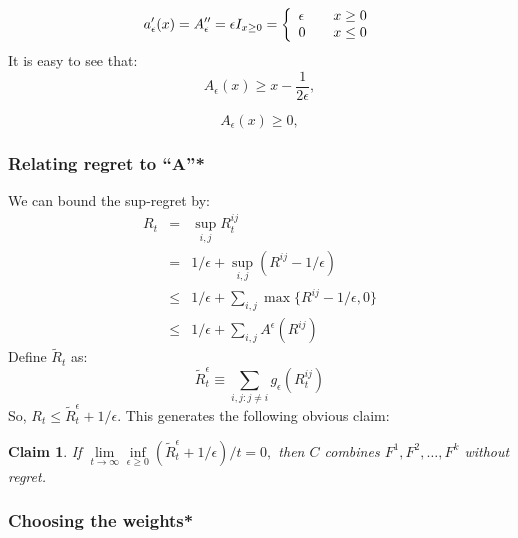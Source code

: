 \documentclass{book}
\newtheorem{claim}{Claim}[chapter]
\begin{document}
\begin{equation}
  a_\epsilon'(x)= A_\epsilon'' = \epsilon I_{x \ge 0} = \left\{ 
  \begin{array}{l@{\qquad}l}
    \epsilon    &  x \ge 0 \\
    0             & x \le  0
  \end{array}
  \right.  
  \label{eqn:A''}
\end{equation}
It is easy to see that:
\begin{equation}
  A_\epsilon(x) \ge x - \frac{1}{2\epsilon}, 
  \label{eqn:A_ge_x}
\end{equation}

\begin{equation}
  A_\epsilon(x) \ge 0,
  \label{eqn:A_ge_0}
\end{equation}
 
 
           \subsubsection{Relating regret to ``A''*}

We can bound the sup-regret by:
\begin{eqnarray*}
R_t & = & \sup_{i,j} R^{ij}_t \\
    & = & 1/\epsilon + \sup_{i,j} (R^{ij} - 1/\epsilon) \\
    &\le& 1/\epsilon + \sum_{i,j} \max\{R^{ij} - 1/\epsilon,0\} \\
    &\le& 1/\epsilon + \sum_{i,j} A^\epsilon(R^{ij})
\end{eqnarray*}
Define $\tilde{R}_t$ as:
\begin{displaymath}
\tilde{R}^\epsilon_t \equiv \sum_{i,j:j \neq i} g_\epsilon(R^{ij}_t)
\end{displaymath}
So,  $R_t \le \tilde{R}^\epsilon_t + 1/\epsilon$.  This generates
the following obvious claim: 
\begin{claim} If  $ \lim\limits_{t \to \infty} \inf\limits_{\epsilon
    \ge 0} \left(\tilde{R}^\epsilon_t + 1/\epsilon\right)/t =
  0,$ then $C$ combines $F^1,F^2,\ldots,F^k$ without regret.
\end{claim}
 
           \subsubsection{Choosing the weights*}
\end{document}
